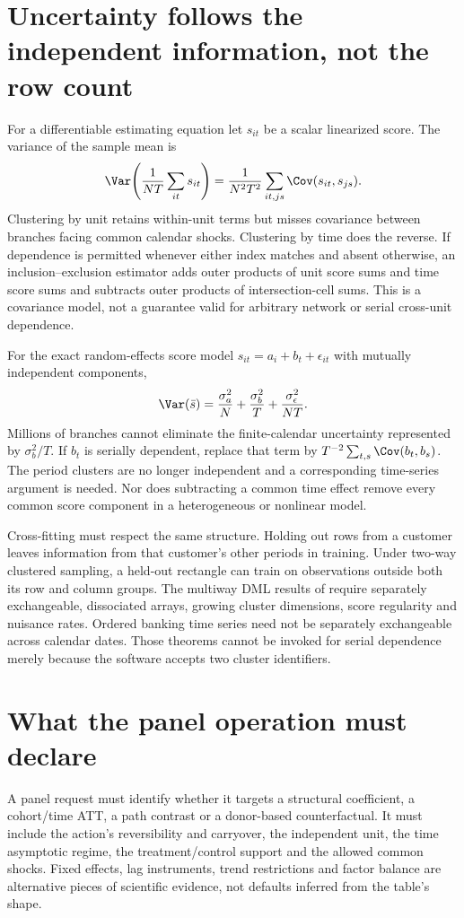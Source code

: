 \section{Uncertainty follows the independent information, not the row count}
\label{r3:panel-inference}
For a differentiable estimating equation let $s_{it}$ be a scalar
linearized score. The variance of the sample mean is
\[
 \Var\!\left(\frac1{NT}\sum_{it}s_{it}\right)
 =\frac1{N^2T^2}\sum_{it,js}\Cov(s_{it},s_{js}).
\]
Clustering by unit retains within-unit terms but misses covariance
between branches facing common calendar shocks. Clustering by time
does the reverse. If dependence is permitted whenever either index
matches and absent otherwise, an inclusion--exclusion estimator adds
outer products of unit score sums and time score sums and subtracts
outer products of intersection-cell sums. This is a covariance model,
not a guarantee valid for arbitrary network or serial cross-unit
dependence.

For the exact random-effects score model
$s_{it}=a_i+b_t+\epsilon_{it}$ with mutually independent components,
\begin{equation}
 \Var(\bar s)=\frac{\sigma_a^2}{N}
             +\frac{\sigma_b^2}{T}
             +\frac{\sigma_\epsilon^2}{NT}.
 \label{r3:panel-information}
\end{equation}
Millions of branches cannot eliminate the finite-calendar uncertainty
represented by $\sigma_b^2/T$. If $b_t$ is serially dependent, replace
that term by $T^{-2}\sum_{t,s}\Cov(b_t,b_s)$. The period
clusters are no longer independent and a corresponding time-series
argument is needed. Nor does subtracting a common time effect remove
every common score component in a heterogeneous or nonlinear model.

Cross-fitting must respect the same structure. Holding out rows from
a customer leaves information from that customer's other periods in
training. Under two-way clustered sampling, a held-out rectangle can
train on observations outside both its row and column groups. The
multiway DML results of \citet[Assumptions 1--3, Theorems 1--2]{cluster2021}
require separately exchangeable, dissociated arrays, growing cluster
dimensions, score regularity and nuisance rates. Ordered banking time
series need not be separately exchangeable across calendar dates.
Those theorems cannot be invoked for serial dependence merely because
the software accepts two cluster identifiers.

\section{What the panel operation must declare}
A panel request must identify whether it targets a structural coefficient,
a cohort/time ATT, a path contrast or a donor-based counterfactual. It
must include the action's reversibility and carryover, the independent
unit, the time asymptotic regime, the treatment/control support and
the allowed common shocks. Fixed effects, lag instruments, trend
restrictions and factor balance are alternative pieces of scientific
evidence, not defaults inferred from the table's shape.

